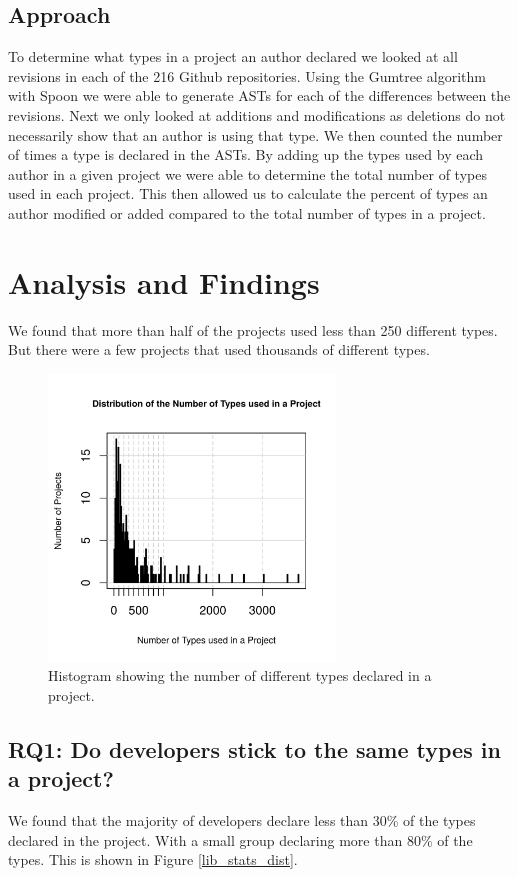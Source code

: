 \documentclass{sig-alternate-05-2015}
\begin{document}
\subsection{Approach}
To determine what types in a project an author declared we looked at all revisions in each of the 216 Github repositories. Using the Gumtree algorithm with Spoon \cite{falleri:hal-01054552} we were able to generate ASTs for each of the differences between the revisions. Next we only looked at additions and modifications as deletions do not necessarily show that an author is using that type. We then counted the number of times a type is declared in the ASTs. By adding up the types used by each author in a given project we were able to determine the total number of types used in each project. This then allowed us to calculate the percent of types an author modified or added compared to the total number of types in a project.

\section{Analysis and Findings}
We found that more than half of the projects used less than 250 different types. But there were a few projects that used thousands of different types.

\begin{figure}[t]
\centering
\includegraphics[height=3in, width=3in]{../lib_stats_number_of_libraries_dist}
\caption{Histogram showing the number of different types declared in a project.}
\label{lib_stats_number_of_libraries_dist}
\end{figure}

\subsection{RQ1: Do developers stick to the same types in a project?}
We found that the majority of developers declare less than 30\% of the types declared in the project. With a small group declaring more than 80\% of the types. This is shown in Figure \ref{lib_stats_dist}.
\end{document}
